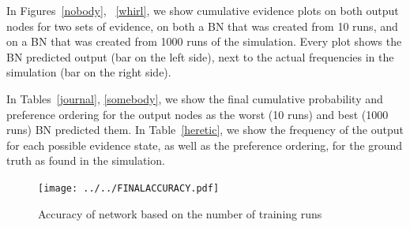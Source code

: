 \documentclass[12pt]{article}
\begin{document}
In Figures~\ref{nobody}, ~\ref{whirl}, we show cumulative evidence plots on both output nodes for two sets of evidence, on both a BN that was created from 10 runs, and on a BN that was created from 1000 runs of the simulation. Every plot shows the BN predicted output (bar on the left side), next to the actual frequencies in the simulation (bar on the right side).

In Tables~\ref{journal}, \ref{somebody}, we show the final cumulative probability and preference ordering for the output nodes as the worst (10 runs) and best (1000 runs) BN predicted them. In Table~\ref{heretic}, we show the frequency of the output for each possible evidence state, as well as the preference ordering, for the ground truth as found in the simulation.



\begin{figure}[htbp]
\begin{center}
\texttt{[image: ../../FINALACCURACY.pdf]}
\caption{Accuracy of network based on the number of training runs}
\label{girl}
\end{center}
\end{figure}
\end{document}
